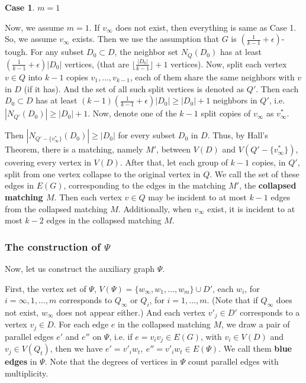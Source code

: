 \documentclass{amsart}
\theoremstyle{definition}
\newtheorem{case}{Case}
\begin{document}
\begin{case}$m=1$\end{case}
Now, we assume $m=1$. If $v_{\infty}$ does not exist, then everything is same as Case 1.
So, we assume $v_{\infty}$ exists. Then we use the assumption that $G$ is $(\frac{1}{k-1}+\epsilon)$-tough. For any subset $D_0\subset D$, the neighbor set $N_Q(D_0)$ has at least $(\frac{1}{k-1}+\epsilon)|D_0|$ vertices, (that are $\lfloor\frac{|D_0|}{k-1}\rfloor+1$ vertices).
Now, split each vertex $v\in Q$ into $k-1$ copies $v_1,\ldots,v_{k-1}$, each of them share the same neighbors with $v$ in $D$ (if it has). And the set of all such split vertices is denoted as $Q'$. Then each $D_0\subset D$ has at least $(k-1)(\frac{1}{k-1}+\epsilon)|D_0|\ge|D_0|+1$ neighbors in $Q'$, i.e. $|N_{Q'}(D_0)|\ge|D_0|+1$. Now, denote one of the $k-1$ split copies of $v_{\infty}$ as $v^*_{\infty}$.

Then $|N_{Q'-\{v^*_{\infty}\}}(D_0)|\ge|D_0|$ for every subset $D_0$ in $D$. Thus, by Hall's Theorem, there is a matching, namely $M'$, between $V(D)$ and $V(Q'-\{v^*_{\infty}\})$, covering every vertex in $V(D)$. 
After that, let each group of $k-1$ copies, in $Q'$, split from one vertex collapse to the original vertex in $Q$. We call the set of these edges in $E(G)$, corresponding to the edges in the matching $M'$, the {\bf collapsed matching $M$}. Then each vertex $v\in Q$ may be incident to at most $k-1$ edges from the collapsed matching $M$.
Additionally, when $v_{\infty}$ exist, it is incident to at most $k-2$ edges in the collapsed matching $M$.









\subsubsection{The construction of $\Psi$}
Now, let us construct the auxiliary graph $\Psi$.

First, the vertex set of $\Psi$, $V(\Psi)=\{w_{\infty},w_1,\ldots,w_m\}\cup D'$, each $w_i$, for 
$i=\infty,1,\ldots,m$ corresponds to $Q_{\infty}$ or $Q_i$, for $i=1,\ldots,m$. (Note that if $Q_{\infty}$ does not exist, $w_{\infty}$ does not appear either.) And each vertex $v'_j\in D'$ corresponds to a vertex $v_j\in D$. For each edge $e$ in the collapsed matching $M$, we draw a pair of parallel edges $e'$ and $e''$ on $\Psi$, i.e. if $e=v_iv_j\in E(G)$, with $v_i\in V(D)$ and $v_j\in V(Q_t)$, then we have $e'=v'_iw_t,~e''=v'_iw_t\in E(\Psi)$. We call them {\bf blue edges} in $\Psi$. Note that the degrees of vertices in $\Psi$ count parallel edges with multiplicity.
\end{document}
